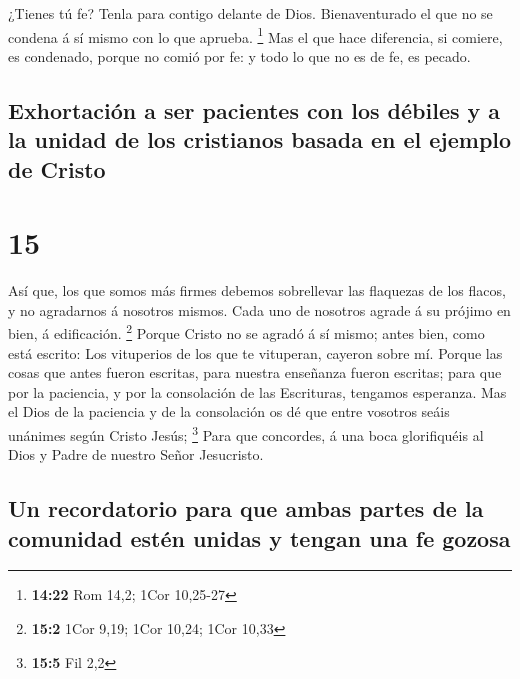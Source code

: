  ¿Tienes tú fe? Tenla para contigo delante de Dios.
Bienaventurado el que no se condena á sí mismo con lo que aprueba.
\footnote{\textbf{14:22} Rom 14,2; 1Cor 10,25-27}  Mas el
que hace diferencia, si comiere, es condenado, porque no comió por fe: y
todo lo que no es de fe, es pecado.

\hypertarget{exhortaciuxf3n-a-ser-pacientes-con-los-duxe9biles-y-a-la-unidad-de-los-cristianos-basada-en-el-ejemplo-de-cristo}{%
\subsection{Exhortación a ser pacientes con los débiles y a la unidad de
los cristianos basada en el ejemplo de
Cristo}\label{exhortaciuxf3n-a-ser-pacientes-con-los-duxe9biles-y-a-la-unidad-de-los-cristianos-basada-en-el-ejemplo-de-cristo}}

\hypertarget{section-14}{%
\section{15}\label{section-14}}

 Así que, los que somos más firmes debemos sobrellevar las
flaquezas de los flacos, y no agradarnos á nosotros mismos.
 Cada uno de nosotros agrade á su prójimo en bien, á
edificación. \footnote{\textbf{15:2} 1Cor 9,19; 1Cor 10,24; 1Cor 10,33}
 Porque Cristo no se agradó á sí mismo; antes bien, como
está escrito: Los vituperios de los que te vituperan, cayeron sobre mí.
 Porque las cosas que antes fueron escritas, para nuestra
enseñanza fueron escritas; para que por la paciencia, y por la
consolación de las Escrituras, tengamos esperanza.  Mas el
Dios de la paciencia y de la consolación os dé que entre vosotros seáis
unánimes según Cristo Jesús; \footnote{\textbf{15:5} Fil 2,2}
 Para que concordes, á una boca glorifiquéis al Dios y
Padre de nuestro Señor Jesucristo.

\hypertarget{un-recordatorio-para-que-ambas-partes-de-la-comunidad-estuxe9n-unidas-y-tengan-una-fe-gozosa}{%
\subsection{Un recordatorio para que ambas partes de la comunidad estén
unidas y tengan una fe
gozosa}\label{un-recordatorio-para-que-ambas-partes-de-la-comunidad-estuxe9n-unidas-y-tengan-una-fe-gozosa}}

